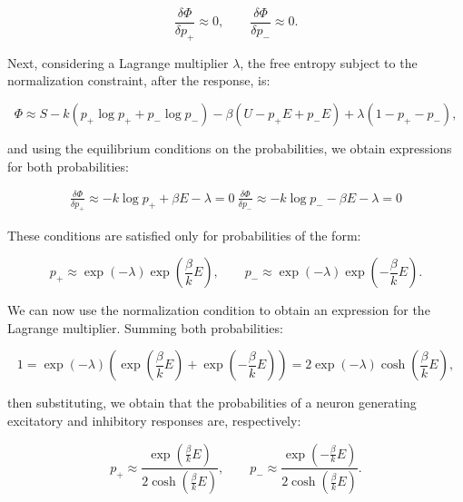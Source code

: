 \documentclass[12pt]{article}
\begin{document}
\begin{equation}
\frac{\delta \Phi}{\delta p_+} \approx 0, \qquad \frac{\delta \Phi}{\delta p_-} \approx 0  .
\end{equation}

Next, considering a Lagrange multiplier $\lambda$, the free entropy subject to the normalization constraint, after the response, is:

\begin{equation}
\Phi \approx S - k (p_+ \log p_+ + p_- \log p_-) - \beta (U - p_+ E + p_- E) + \lambda (1 - p_+ - p_-),
\end{equation}

and using the equilibrium conditions on the probabilities, we obtain expressions for both probabilities:

\begin{equation}
\begin{aligned}  
\frac{\delta \Phi}{\delta p_+} \approx - k \log p_+ + \beta E - \lambda = 0 \  
\frac{\delta \Phi}{\delta p_-} \approx - k \log p_- - \beta E - \lambda = 0  
\end{aligned}
\end{equation}

These conditions are satisfied only for probabilities of the form:

\begin{equation}
p_+ \approx \exp(-\lambda) \exp\left(\frac{\beta}{k} E\right)
, \qquad  
p_- \approx \exp(-\lambda) \exp\left(-\frac{\beta}{k} E\right).
\end{equation}

We can now use the normalization condition to obtain an expression for the Lagrange multiplier. Summing both probabilities:

\begin{equation}
1 = \exp(-\lambda) \left(\exp\left(\frac{\beta}{k} E\right) + \exp\left(-\frac{\beta}{k} E\right)\right) = 2 \exp(-\lambda) \cosh\left(\frac{\beta}{k} E\right) ,
\end{equation}

then substituting, we obtain that the probabilities of a neuron generating excitatory and inhibitory responses are, respectively:

\begin{equation}
p_+ \approx \frac{\exp(\frac{\beta}{k} E)}{2 \cosh(\frac{\beta}{k} E)}, \qquad  
p_- \approx \frac{\exp(-\frac{\beta}{k} E)}{2 \cosh(\frac{\beta}{k} E)}  .
\end{equation}
\end{document}
